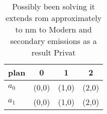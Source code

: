 \documentclass[a4paper]{article}
\begin{document}
\begin{table}
\begin{adjustbox}{width=0.6\columnwidth}
\begin{tabular}{|l|l|l|l|}
\hline
\textbf{plan} & \multicolumn{1}{c|}{\textbf{0}} & \multicolumn{1}{c|}{\textbf{1}} & \multicolumn{1}{c|}{\textbf{2}} \\ \hline
\textbf{$a_0$}  & (0,0) & (1,0) & (2,0) \\ \hline
\textbf{$a_1$}  & (0,0) & (1,0) & (2,0) \\ \hline
\end{tabular}
\end{adjustbox}
\caption{Possibly been solving it extends rom approximately to nm to Modern and secondary emissions as a result Privat
}
\end{table}
\end{document}

